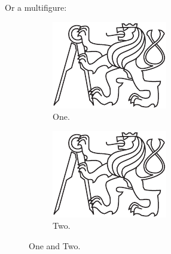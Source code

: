 Or a multifigure:
\begin{figure}[H]
\begin{center}
	\begin{subfigure}[b]{0.2\textwidth}
		\includegraphics[width=\textwidth]{./figures/fig.pdf}
		\caption{One.}
		\label{fig:one}
	\end{subfigure}
	\begin{subfigure}[b]{0.2\textwidth}
		\includegraphics[width=\textwidth]{./figures/fig.pdf}
		\caption{Two.}
		\label{fig:two}
	\end{subfigure}
	\caption{One and Two.}
	\label{fig:onetwo}
\end{center}
\end{figure}

